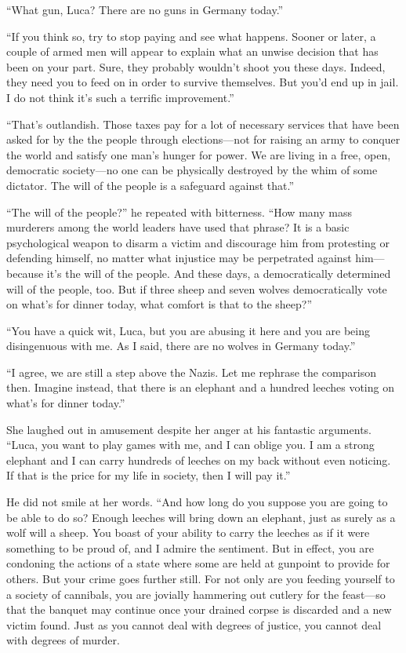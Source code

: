 ``What gun, Luca? There are no guns in Germany today.''

``If you think so, try to stop paying and see what happens. Sooner or later, a couple of armed men will appear to explain what an unwise decision that has been on your part. Sure, they probably wouldn't shoot you these days. Indeed, they need you to feed on in order to survive themselves. But you'd end up in jail. I do not think it's such a terrific improvement.''

``That's outlandish. Those taxes pay for a lot of necessary services that have been asked for by the the people through elections---not for raising an army to conquer the world and satisfy one man's hunger for power. We are living in a free, open, democratic society---no one can be physically destroyed by the whim of some dictator. The will of the people is a safeguard against that.''

``The will of the people?'' he repeated with bitterness. ``How many mass murderers among the world leaders have used that phrase? It is a basic psychological weapon to disarm a victim and discourage him from protesting or defending himself, no matter what injustice may be perpetrated against him---because it's the will of the people. And these days, a democratically determined will of the people, too. But if three sheep and seven wolves democratically vote on what's for dinner today, what comfort is that to the sheep?''

``You have a quick wit, Luca, but you are abusing it here and you are being disingenuous with me. As I said, there are no wolves in Germany today.''

``I agree, we are still a step above the Nazis. Let me rephrase the comparison then. Imagine instead, that there is an elephant and a hundred leeches voting on what's for dinner today.''

She laughed out in amusement despite her anger at his fantastic arguments. ``Luca, you want to play games with me, and I can oblige you. I am a strong elephant and I can carry hundreds of leeches on my back without even noticing. If that is the price for my life in society, then I will pay it.''

He did not smile at her words. ``And how long do you suppose you are going to be able to do so? Enough leeches will bring down an elephant, just as surely as a wolf will a sheep. You boast of your ability to carry the leeches as if it were something to be proud of, and I admire the sentiment. But in effect, you are condoning the actions of a state where some are held at gunpoint to provide for others. But your crime goes further still. For not only are you feeding yourself to a society of cannibals, you are jovially hammering out cutlery for the feast---so that the banquet may continue once your drained corpse is discarded and a new victim found. Just as you cannot deal with degrees of justice, you cannot deal with degrees of murder.

